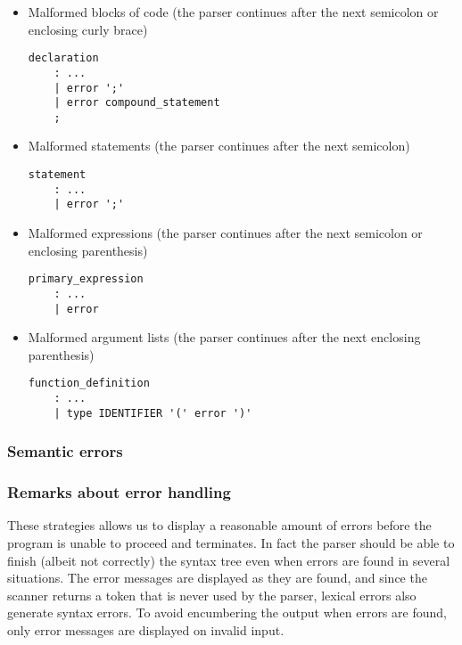 \begin{itemize}
\item  Malformed blocks of code (the parser continues after the next semicolon or enclosing
curly brace)
\begin{lstlisting}
declaration
	: ...
	| error ';'
	| error compound_statement
	;

\end{lstlisting}

\item  Malformed statements (the parser continues after the next semicolon)
\begin{lstlisting}
statement
	: ...
	| error ';'
\end{lstlisting}

\item  Malformed expressions (the parser continues after the next semicolon or enclosing
parenthesis)
\begin{lstlisting}
primary_expression
	: ...
	| error
\end{lstlisting}

\item  Malformed argument lists (the parser continues after the next enclosing parenthesis)
\begin{lstlisting}
function_definition
	: ...
	| type IDENTIFIER '(' error ')'
\end{lstlisting}
\end{itemize}


\subsubsection{Semantic errors}

\subsubsection{Remarks about error handling}
These strategies allows us to display a reasonable amount of errors before the program is unable
to proceed and terminates. In fact the parser should be able to finish (albeit not correctly)
the syntax tree even when errors are found in several situations.
The error messages are displayed as they are found, and since the
scanner returns a token that is never used by the parser, lexical errors also generate syntax
errors. To avoid encumbering the output when errors are found, only error messages are
displayed on invalid input.

